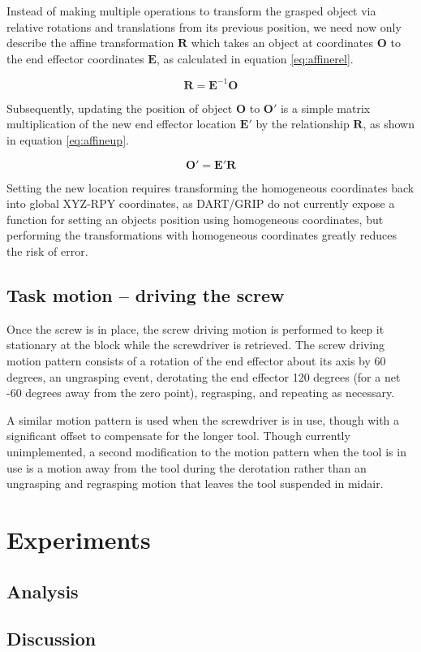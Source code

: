 \documentclass[10pt, conference]{IEEEtran}
\begin{document}
   Instead of making multiple operations to transform the grasped object
   via relative rotations and translations from its previous position,
   we need now only describe the affine transformation \(\mathbf{R}\)
   which takes an object at coordinates \(\mathbf{O}\) to the end
   effector coordinates \(\mathbf{E}\), as calculated in equation
   \ref{eq:affinerel}.

   \begin{equation}\label{eq:affinerel}
   \mathbf{R} = \mathbf{E}^{-1}\mathbf{O}
   \end{equation}

   Subsequently, updating the position of object \(\mathbf{O}\) to
   \(\mathbf{O'}\) is a simple matrix multiplication of the new end
   effector location \(\mathbf{E'}\) by the relationship \(\mathbf{R}\),
   as shown in equation \ref{eq:affineup}.

   \begin{equation}\label{eq:affineup}
   \mathbf{O'} = \mathbf{E'}\mathbf{R}
   \end{equation}

   Setting the new location requires transforming the homogeneous
   coordinates back into global XYZ-RPY coordinates, as DART/GRIP do not
   currently expose a function for setting an objects position using
   homogeneous coordinates, but performing the transformations with
   homogeneous coordinates greatly reduces the risk of error.
\subsection{Task motion -- driving the screw}
\label{sec-3-5}

   Once the screw is in place, the screw driving motion is performed to
   keep it stationary at the block while the screwdriver is
   retrieved. The screw driving motion pattern consists of a rotation of
   the end effector about its axis by 60 degrees, an ungrasping event,
   derotating the end effector 120 degrees (for a net -60 degrees away
   from the zero point), regrasping, and repeating as necessary.

   A similar motion pattern is used when the screwdriver is in use,
   though with a significant offset to compensate for the longer
   tool. Though currently unimplemented, a second modification to the
   motion pattern when the tool is in use is a motion away from the tool
   during the derotation rather than an ungrasping and regrasping motion
   that leaves the tool suspended in midair.
\section{Experiments}
\label{sec-4}
\subsection{Analysis}
\label{sec-4-1}
\subsection{Discussion}
\label{sec-4-2}
\end{document}
